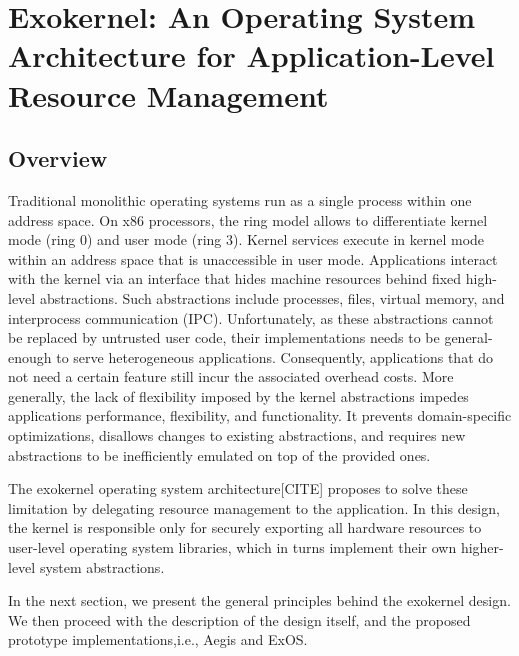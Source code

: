 \section{Exokernel: An Operating System Architecture for Application-Level Resource Management}

\subsection{Overview}
Traditional monolithic operating systems run as a single process within one address space.
On x86 processors, the ring model allows to differentiate kernel mode (ring 0) and user mode (ring 3).
Kernel services execute in kernel mode within an address space that is unaccessible in user mode.
Applications interact with the kernel via an interface that hides machine resources behind fixed high-level abstractions.
Such abstractions include processes, files, virtual memory, and interprocess communication (IPC).
Unfortunately, as these abstractions cannot be replaced by untrusted user code, their implementations needs to be general-enough to serve heterogeneous applications.
Consequently, applications that do not need a certain feature still incur the associated overhead costs.
More generally, the lack of flexibility imposed by the kernel abstractions impedes applications performance, flexibility, and functionality.
It prevents domain-specific optimizations, disallows changes to existing abstractions, and requires new abstractions to be inefficiently emulated on top of the provided ones.

The exokernel operating system architecture[CITE] proposes to solve these limitation by delegating resource management to the application.
In this design, the kernel is responsible only for securely exporting all hardware resources to user-level operating system libraries, which in turns implement their own higher-level system abstractions.

In the next section, we present the general principles behind the exokernel design.
We then proceed with the description of the design itself, and the proposed prototype implementations,i.e., Aegis and ExOS.

%
%
% 
%
%
%
%
%

